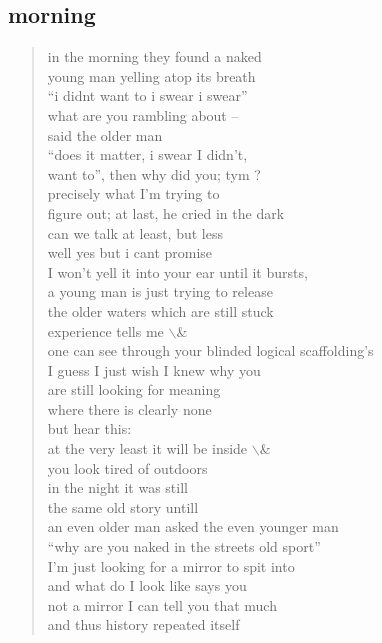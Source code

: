 \documentclass[11pt]{article}
\begin{document}
\subsection{morning}
\label{sec:orgbf94dba}
\begin{verse}
in the morning they found a naked\\
young man yelling atop its breath\\
``i didnt want to i swear i swear''\\
what are you rambling about --\\
said the older man\\
``does it matter, i swear I didn't,\\
want to'', then why did you; tym ?\\
precisely what I'm trying to\\
figure out; at last, he cried in the dark\\
\vspace*{1em}
can we talk at least, but less\\
well yes but i cant promise\\
I won't yell it into your ear until it bursts,\\
a young man is just trying to release\\
the older waters which are still stuck\\
experience tells me $\backslash$&\\
one can see through your blinded logical scaffolding's\\
I guess I just wish I knew why you\\
are still looking for meaning\\
where there is clearly none\\
but hear this:\\
at the very least it will be inside $\backslash$&\\
\vspace*{1em}
you look tired of outdoors\\
in the night it was still\\
the same old story untill\\
an even older man asked the even younger man\\
``why are you naked in the streets old sport''\\
I'm just looking for a mirror to spit into\\
and what do I look like says you\\
not a mirror I can tell you that much\\
and thus history repeated itself\\

\end{verse}
\end{document}
